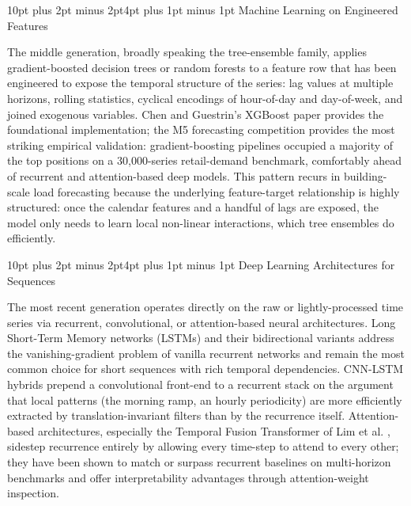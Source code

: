 \documentclass[12pt,a4paper,openany]{report}
\makeatletter
\renewcommand{\section}{\@startsection{section}{1}{\z@}%
  {10pt plus 2pt minus 2pt}{4pt plus 1pt minus 1pt}%
  {\normalfont\normalsize\bfseries}}
\makeatother
\begin{document}
\section{Machine Learning on Engineered Features}

The middle generation, broadly speaking the tree-ensemble family, applies gradient-boosted decision trees or random forests to a feature row that has been engineered to expose the temporal structure of the series: lag values at multiple horizons, rolling statistics, cyclical encodings of hour-of-day and day-of-week, and joined exogenous variables. Chen and Guestrin's XGBoost paper \cite{ref_chen_xgboost} provides the foundational implementation; the M5 forecasting competition \cite{ref_makridakis_m5} provides the most striking empirical validation: gradient-boosting pipelines occupied a majority of the top positions on a 30{,}000-series retail-demand benchmark, comfortably ahead of recurrent and attention-based deep models. This pattern recurs in building-scale load forecasting because the underlying feature-target relationship is highly structured: once the calendar features and a handful of lags are exposed, the model only needs to learn local non-linear interactions, which tree ensembles do efficiently.

\section{Deep Learning Architectures for Sequences}

The most recent generation operates directly on the raw or lightly-processed time series via recurrent, convolutional, or attention-based neural architectures. Long Short-Term Memory networks (LSTMs) and their bidirectional variants address the vanishing-gradient problem of vanilla recurrent networks and remain the most common choice for short sequences with rich temporal dependencies. CNN-LSTM hybrids \cite{ref_kim_cnnlstm} prepend a convolutional front-end to a recurrent stack on the argument that local patterns (the morning ramp, an hourly periodicity) are more efficiently extracted by translation-invariant filters than by the recurrence itself. Attention-based architectures, especially the Temporal Fusion Transformer of Lim et al. \cite{ref_lim_tft}, sidestep recurrence entirely by allowing every time-step to attend to every other; they have been shown to match or surpass recurrent baselines on multi-horizon benchmarks and offer interpretability advantages through attention-weight inspection.
\end{document}
